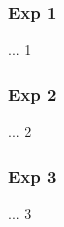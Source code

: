         \subsubsection{Exp 1}  %
            ... 1

        \subsubsection{Exp 2}
            ... 2

        \subsubsection{Exp 3}
            ... 3

